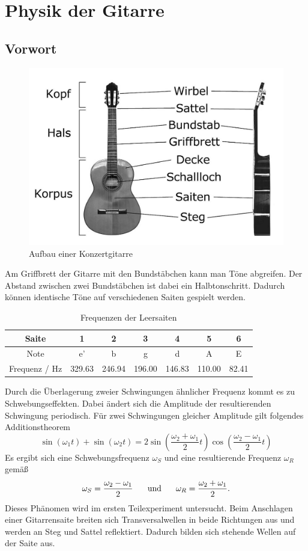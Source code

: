 \section{Physik der Gitarre}

\subsection{Vorwort}


\begin{figure}[h]
	\centering
	\includegraphics{bilder/gitarre_aufbau.jpg}
	\caption{Aufbau einer Konzertgitarre}
\end{figure}

Am Griffbrett der Gitarre mit den Bundstäbchen kann man Töne abgreifen. Der Abstand zwischen zwei Bundstäbchen ist dabei ein Halbtonschritt. Dadurch können identische Töne auf verschiedenen Saiten gespielt werden.

\begin{table}[H]
\centering
\begin{tabular}{c|cccccc}
Saite & 1 & 2 & 3 & 4 & 5 & 6 \\
\hline
Note & e' & b & g & d & A & E \\
\hline
Frequenz / Hz & 329.63 & 246.94 & 196.00 & 146.83 & 110.00 & 82.41  
\end{tabular}
\caption{Frequenzen der Leersaiten}
\end{table}

Durch die Überlagerung zweier Schwingungen ähnlicher Frequenz kommt es zu Schwebungseffekten. Dabei ändert sich die Amplitude der resultierenden Schwingung periodisch. Für zwei Schwingungen gleicher Amplitude gilt folgendes Additionstheorem
$$\sin(\omega_1t)+\sin(\omega_2t) = 2\sin\left( \frac{\omega_2+\omega_1}2t \right) \cos\left( \frac{\omega_2-\omega_1}2t \right)$$
Es ergibt sich eine Schwebungsfrequenz $\omega_S$ und eine resultierende Frequenz $\omega_R$ gemäß
$$\omega_S = \frac{\omega_2-\omega_1}2 \hspace{0.5cm} \text{ und } \hspace{0.5cm} \omega_R = \frac{\omega_2+\omega_1}2.$$
Dieses Phänomen wird im ersten Teilexperiment untersucht.
Beim Anschlagen einer Gitarrensaite breiten sich Transversalwellen in beide Richtungen aus und werden an Steg und Sattel reflektiert. Dadurch bilden sich stehende Wellen auf der Saite aus. 


